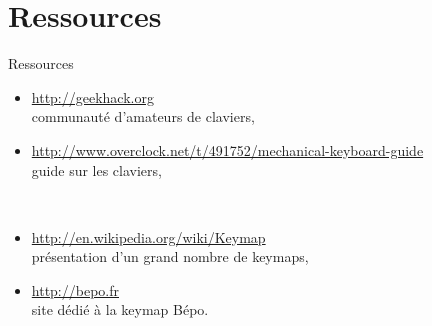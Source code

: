 \section*{Ressources}

\begin{frame}{Ressources}
	\begin{itemize}
		\item \url{http://geekhack.org}\\
		communauté d’amateurs de claviers,
		\item {\footnotesize
		\url{http://www.overclock.net/t/491752/mechanical-keyboard-guide}}\\
		guide sur les claviers,
	\end{itemize}
	~\\
	\begin{itemize}
		\item \url{http://en.wikipedia.org/wiki/Keymap}\\
		présentation d’un grand nombre de keymaps,
		\item \url{http://bepo.fr}\\
		site dédié à la keymap Bépo.
	\end{itemize}
\end{frame}
